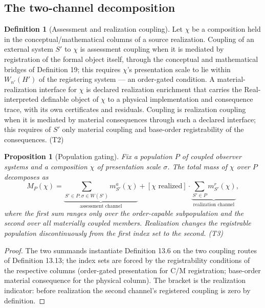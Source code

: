 \documentclass[11pt]{article}
\newtheorem{proposition}{Proposition}
\theoremstyle{definition}
\newtheorem{definition}{Definition}
\begin{document}
\subsection{The two-channel decomposition}

\begin{definition}[Assessment and realization coupling]
Let $\chi$ be a composition held in the conceptual/mathematical columns of a source realization. Coupling of an external system $S'$ to $\chi$ is assessment coupling when it is mediated by registration of the formal object itself, through the conceptual and mathematical bridges of Definition 19; this requires $\chi$'s presentation scale to lie within $W_{n'}(H')$ of the registering system --- an order-gated condition. A material-realization interface for $\chi$ is declared realization enrichment that carries the Real-interpreted definable object of $\chi$ to a physical implementation and consequence trace, with its own certificates and residuals. Coupling is realization coupling when it is mediated by material consequences through such a declared interface; this requires of $S'$ only material coupling and base-order registrability of the consequences. (T2)
\end{definition}

\begin{proposition}[Population gating]
Fix a population $P$ of coupled observer systems and a composition $\chi$ of presentation scale $\sigma$. The total mass of $\chi$ over $P$ decomposes as
\[
M_P(\chi) = \underbrace{\sum_{S' \in P: \sigma \in W(S')} m^a_{S'}(\chi)}_{\text{assessment channel}} + [\chi \text{ realized}] \cdot \underbrace{\sum_{S' \in P} m^r_{S'}(\chi)}_{\text{realization channel}},
\]
where the first sum ranges only over the order-capable subpopulation and the second over all materially coupled members. Realization changes the registrable population discontinuously from the first index set to the second. (T3)
\end{proposition}

\begin{proof}
The two summands instantiate Definition 13.6 on the two coupling routes of Definition 13.13; the index sets are forced by the registrability conditions of the respective columns (order-gated presentation for C/M registration; base-order material consequence for the physical column). The bracket is the realization indicator: before realization the second channel's registered coupling is zero by definition.
\end{proof}
\end{document}
